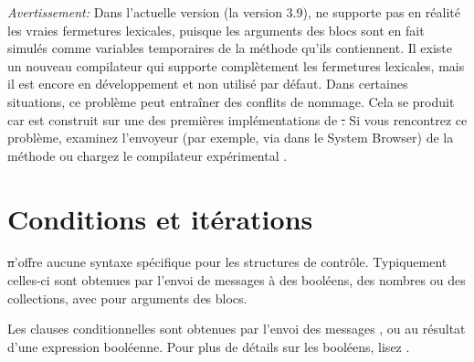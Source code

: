 \documentclass[a4paper,10pt,twoside]{book}
\begin{document}
\newpage
\emph{Avertissement:} Dans l'actuelle version (la version 3.9), \sq ne supporte pas en r\'{e}alit\'{e} les vraies fermetures lexicales, puisque les arguments des blocs sont en fait simul\'{e}s comme variables temporaires de la m\'{e}thode qu'ils contiennent. Il existe un nouveau compilateur qui supporte compl\`{e}tement les fermetures lexicales, mais il est encore en d\'{e}veloppement et non utilis\'{e} par d\'{e}faut.
Dans certaines situations, ce probl\`{e}me peut entraîner des conflits de nommage. Cela se produit car \sq est construit sur une des premi\`{e}res impl\'{e}mentations de \st.
Si vous rencontrez ce probl\`{e}me, examinez l'envoyeur 
(par exemple, via  dans le System Browser)
de la m\'{e}thode  ou chargez le
compilateur 
expérimental .






\section{Conditions et it\'{e}rations}

\st n'offre aucune syntaxe sp\'{e}cifique pour les structures de contr\^{o}le.
Typiquement celles-ci sont obtenues par l'envoi de messages \`{a} des bool\'{e}ens, des nombres ou des collections, avec pour arguments des blocs.

Les clauses conditionnelles sont obtenues par l'envoi des messages
,  ou
 au r\'{e}sultat d'une expression
bool\'{e}enne. Pour plus de détails sur les booléens, lisez .
\end{document}
